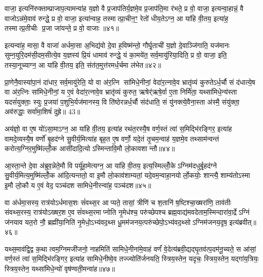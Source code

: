 वाजा॒ इत्यनि॑रुक्ताम्प्राजाप॒त्यामन्वा॑ह य॒ज्ञो वै प्र॒जाप॑तिर्य॒ज्ञमे॒व प्र॒जाप॑ति॒मा र॑भते॒ प्र वो॒ वाजा॒ इत्यन्वा॒हान्नं॒ वै वाजोऽन्न॑मे॒वाव॑ रुन्द्धे॒ प्र वो॒ वाजा॒ इत्या॑न्वाह॒ तस्मात्प्रा॒चीन॒ꣳ॒ रेतो॑ धीय॒तेऽग्न॒ आ या॑हि वी॒तय॒ इत्या॑ह॒ तस्मात्प्र॒तीचीः प्र॒जा जा॑यन्ते॒ प्र वो॒ वाजाः॥४१॥

इत्यन्वा॑ह॒ मासा॒ वै वाजा॑ अर्धमा॒सा अ॒भिद्य॑वो दे॒वा ह॒विष्म॑न्तो॒ गौर्घृ॒ताची॑ य॒ज्ञो दे॒वाञ्जि॑गाति॒ यज॑मानः सुम्न॒युरि॒दम॑सी॒दम॒सीत्ये॒व य॒ज्ञस्य॑ प्रि॒यं धामाव॑ रुन्द्धे॒ यं का॒मये॑त॒ सर्व॒मायु॑रिया॒दिति॒ प्र वो॒ वाजा॒ इति॒ तस्या॒नूच्याग्न॒ आ या॑हि वी॒तय॒ इति॒ संत॑त॒मुत्त॑रमर्ध॒र्चमा ल॑भेत॥४२॥

प्रा॒णेनै॒वास्या॑पा॒नं दा॑धार॒ सर्व॒मायु॑रेति॒ यो वा अ॑र॒त्नि सा॑मिधे॒नीनां॒ वेदा॑र॒त्नावे॒व भ्रातृ॑व्यं कुरुतेऽर्ध॒र्चौ सं द॑धात्ये॒ष वा अ॑र॒त्निः सा॑मिधे॒नीनां॒ य ए॒वं वेदा॑र॒त्नावे॒व भ्रातृ॑व्यं कुरुत॒ ऋषेर्\mbox{}॑ऋषे॒र्वा ए॒ता निर्मि॑ता॒ यथ्सा॑मिधे॒न्य॑स्ता यदसं॑युक्ताः॒ स्युः प्र॒जया॑ प॒शुभि॒र्यज॑मानस्य॒ वि ति॑ष्ठेरन्नर्ध॒र्चौ संद॑धाति॒ सं यु॑नक्त्ये॒वैना॒स्ता अ॑स्मै॒ संयु॑क्ता॒ अव॑रुद्धाः॒ सर्वा॑मा॒शिषं॑ दुह्रे॥ 43॥

{\anuvakamend[{ब॒र्\mbox{}सं वो॑ जायन्ते॒ प्र वो॒ वाजा॑ लभेत दधाति॒ सन्दश॑ च॥७॥}]}

अय॑ज्ञो॒ वा ए॒ष यो॑ऽसा॒माऽग्न॒ आ या॑हि वी॒तय॒ इत्या॑ह रथंत॒रस्यै॒ष वर्ण॒स्तं त्वा॑ स॒मिद्भि॑रङ्गिर॒ इत्या॑ह वामदे॒व्यस्यै॒ष वर्णो॑ बृ॒हद॑ग्ने सु॒वीर्य॒मित्या॑ह बृह॒त ए॒ष वर्णो॒ यदे॒तं तृ॒चम॒न्वाह॑ य॒ज्ञमे॒व तथ्साम॑न्वन्तं करोत्य॒ग्निर॒मुष्मि॑ल्लोँ॒क आसी॑दादि॒त्योऽस्मिन्तावि॒मौ लो॒कावशान्तौ॥४४॥

आ॒स्ता॒न्ते दे॒वा अ॑ब्रुव॒न्नेते॒मौ वि पर्यू॑हा॒मेत्यग्न॒ आ या॑हि वी॒तय॒ इत्य॒स्मिल्लोँ॒केऽग्निम॑दधुर्बृ॒हद॑ग्ने सु॒वीर्य॒मित्य॒मुष्मि॑ल्लोँ॒क आ॑दि॒त्यन्ततो॒ वा इ॒मौ लो॒काव॑शाम्यतां॒ यदे॒वम॒न्वाहा॒नयोर्लो॒कयोः॒ शान्त्यै॒ शाम्य॑तोऽस्मा इ॒मौ लो॒कौ य ए॒वं वेद॒ पञ्च॑दश सामिधे॒नीरन्वा॑ह॒ पञ्च॑दश॥४५॥

वा अ॑र्धमा॒सस्य॒ रात्र॑योऽर्धमास॒शः सं॑वथ्स॒र आप्यते॒ तासां॒ त्रीणि॑ च श॒तानि॑ ष॒ष्टिश्चा॒ख्षरा॑णि॒ ताव॑तीः संवथ्स॒रस्य॒ रात्र॑योऽख्षर॒श ए॒व सं॑वथ्स॒रमाप्नोति नृ॒मेध॑श्च॒ परु॑च्छेपश्च ब्रह्म॒वाद्य॑मवदेताम॒स्मिन्दारा॑वा॒र्द्रेऽग्निं ज॑नयाव यत॒रो नौ॒ ब्रह्मी॑या॒निति॑ नृ॒मेधो॒ऽभ्य॑वद॒थ्स धू॒मम॑जनय॒त्परु॑च्छेपो॒ऽभ्य॑वद॒थ्सोऽग्निम॑जनय॒दृष॒ इत्य॑ब्रवीत्॥४६॥

यथ्स॒माव॑द्वि॒द्व क॒था त्वम॒ग्निमजी॑जनो॒ नाहमिति॑ सामिधे॒नीना॑मे॒वाहं वर्णं॑ वे॒देत्य॑ब्रवी॒द्यद्घृ॒तव॑त्प॒दम॑नू॒च्यते॒ स आ॑सां॒ वर्ण॒स्तं त्वा॑ स॒मिद्भि॑रङ्गिर॒ इत्या॑ह सामिधे॒नीष्वे॒व तज्ज्योति॑र्जनयति॒ स्त्रिय॒स्तेन॒ यदृचः॒ स्त्रिय॒स्तेन॒ यद्गा॑य॒त्रियः॒ स्त्रिय॒स्तेन॒ यथ्सा॑मिधे॒न्यो॑ वृष॑ण्वती॒मन्वा॑ह॥४७॥

